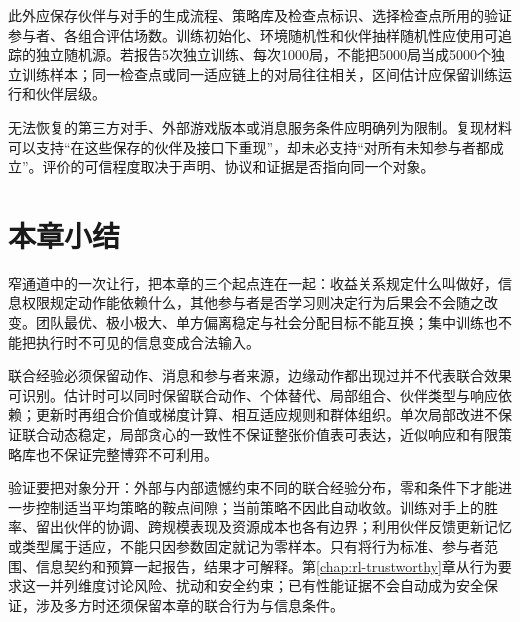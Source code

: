 此外应保存伙伴与对手的生成流程、策略库及检查点标识、选择检查点所用的验证参与者、各组合评估场数。训练初始化、环境随机性和伙伴抽样随机性应使用可追踪的独立随机源。若报告5次独立训练、每次1000局，不能把5000局当成5000个独立训练样本；同一检查点或同一适应链上的对局往往相关，区间估计应保留训练运行和伙伴层级。

无法恢复的第三方对手、外部游戏版本或消息服务条件应明确列为限制。复现材料可以支持“在这些保存的伙伴及接口下重现”，却未必支持“对所有未知参与者都成立”。评价的可信程度取决于声明、协议和证据是否指向同一个对象。

\section{本章小结}
\label{sec:rl-multi-agent-summary}

窄通道中的一次让行，把本章的三个起点连在一起：收益关系规定什么叫做好，信息权限规定动作能依赖什么，其他参与者是否学习则决定行为后果会不会随之改变。团队最优、极小极大、单方偏离稳定与社会分配目标不能互换；集中训练也不能把执行时不可见的信息变成合法输入。

联合经验必须保留动作、消息和参与者来源，边缘动作都出现过并不代表联合效果可识别。估计时可以同时保留联合动作、个体替代、局部组合、伙伴类型与响应依赖；更新时再组合价值或梯度计算、相互适应规则和群体组织。单次局部改进不保证联合动态稳定，局部贪心的一致性不保证整张价值表可表达，近似响应和有限策略库也不保证完整博弈不可利用。

验证要把对象分开：外部与内部遗憾约束不同的联合经验分布，零和条件下才能进一步控制适当平均策略的鞍点间隙；当前策略不因此自动收敛。训练对手上的胜率、留出伙伴的协调、跨规模表现及资源成本也各有边界；利用伙伴反馈更新记忆或类型属于适应，不能只因参数固定就记为零样本。只有将行为标准、参与者范围、信息契约和预算一起报告，结果才可解释。第\ref{chap:rl-trustworthy}章从行为要求这一并列维度讨论风险、扰动和安全约束；已有性能证据不会自动成为安全保证，涉及多方时还须保留本章的联合行为与信息条件。
